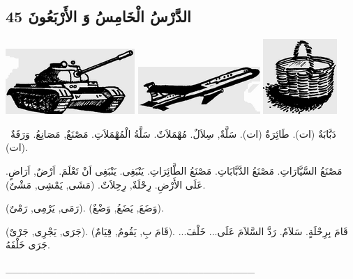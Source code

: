\documentclass[a5paper]{article}
\begin{document}
\subsection{الدَّرْسُ الْخَامِسُ وَ الأَرْبَعُونَ 45}
 \includegraphics[width=1.9272in,height=0.9791in]{images/MuhammadBagauddinprettified-img142.png}  \includegraphics[width=1.8228in,height=0.7083in]{images/MuhammadBagauddinprettified-img143.png}   \includegraphics[width=1.1043in,height=1.1252in]{images/MuhammadBagauddinprettified-img144.png} 

\ دَبَّابَةٌ (ات). طَائِرَةٌ (ات). سَلَّةٌ, سِلاَلٌ. مُهْمَلاَتٌ. سَلَّةُ الْمُهْمَلاَتِ. مَصْنَعٌ, مَصَانِعُ. وَرَقَةٌ (ات). 

مَصْنَعُ السَّيَّارَاتِ. مَصْنَعُ الدَّبَّابَاتِ. مَصْنَعُ الطَّائِرَاتِ. يَنْبَغِى. يَنْبَغِى اَنْ تَعْلَمَ. اَرْضٌ, اَرَاضٍ. عَلَى الأَرْضِ. رِحْلَةٌ, رِحِلاَتٌ. (مَشَى, يَمْشِى, مَشْىٌ). 

(رَمَى, يَرْمِى, رَمْىٌ). (وَضَعَ, يَضَعُ, وَضْعٌ).

(جَرَى, يَجْرِى, جَرْىٌ). (قَامَ بِ, يَقُومُ, قِيَامٌ). قَامَ بِرِحْلَةٍ. سَلاَمٌ. رَدَّ السَّلاَمَ عَلَى... خَلْفَ... جَرَى خَلْفَهُ.

\_\_\_\_\_\_\_\_\_\_\_\_\_\_\_\_\_\_\_\_\_\_\_\_\_\_\_\_\_\_\_\_\_\_
\end{document}
